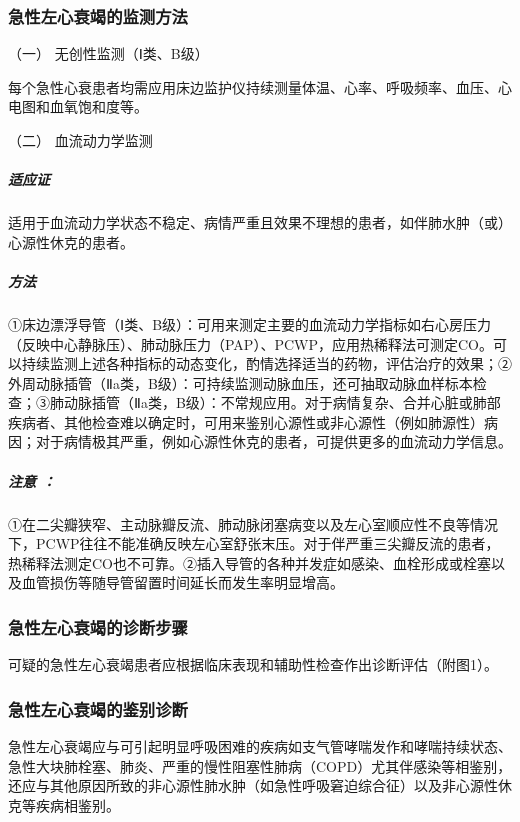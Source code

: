 \subsubsection{急性左心衰竭的监测方法}

\hypertarget{text00071.htmlux5cux23CHP3-2-5-4-5-1}{}
（一） 无创性监测（Ⅰ类、B级）

每个急性心衰患者均需应用床边监护仪持续测量体温、心率、呼吸频率、血压、心电图和血氧饱和度等。

\hypertarget{text00071.htmlux5cux23CHP3-2-5-4-5-2}{}
（二） 血流动力学监测

\subparagraph{适应证}

适用于血流动力学状态不稳定、病情严重且效果不理想的患者，如伴肺水肿（或）心源性休克的患者。

\subparagraph{方法}

①床边漂浮导管（Ⅰ类、B级）：可用来测定主要的血流动力学指标如右心房压力（反映中心静脉压）、肺动脉压力（PAP）、PCWP，应用热稀释法可测定CO。可以持续监测上述各种指标的动态变化，酌情选择适当的药物，评估治疗的效果；②外周动脉插管（Ⅱa类，B级）：可持续监测动脉血压，还可抽取动脉血样标本检查；③肺动脉插管（Ⅱa类，B级）：不常规应用。对于病情复杂、合并心脏或肺部疾病者、其他检查难以确定时，可用来鉴别心源性或非心源性（例如肺源性）病因；对于病情极其严重，例如心源性休克的患者，可提供更多的血流动力学信息。

\subparagraph{注意 ：}

①在二尖瓣狭窄、主动脉瓣反流、肺动脉闭塞病变以及左心室顺应性不良等情况下，PCWP往往不能准确反映左心室舒张末压。对于伴严重三尖瓣反流的患者，热稀释法测定CO也不可靠。②插入导管的各种并发症如感染、血栓形成或栓塞以及血管损伤等随导管留置时间延长而发生率明显增高。

\subsubsection{急性左心衰竭的诊断步骤}

可疑的急性左心衰竭患者应根据临床表现和辅助性检查作出诊断评估（附图1）。

\subsubsection{急性左心衰竭的鉴别诊断}

急性左心衰竭应与可引起明显呼吸困难的疾病如支气管哮喘发作和哮喘持续状态、急性大块肺栓塞、肺炎、严重的慢性阻塞性肺病（COPD）尤其伴感染等相鉴别，还应与其他原因所致的非心源性肺水肿（如急性呼吸窘迫综合征）以及非心源性休克等疾病相鉴别。

